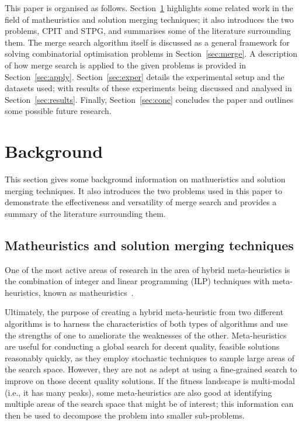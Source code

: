 \documentclass[journal]{IEEEtran}
\begin{document}
This paper is organised as follows. Section~\ref{sec:back} highlights some related work in the field of matheuristics and solution merging techniques; it also introduces the two problems, CPIT and STPG, and summarises some of the literature surrounding them. The merge search algorithm itself is discussed as a general framework for solving combinatorial optimisation problems in Section~\ref{sec:merge}. A description of how merge search is applied to the given problems is provided in Section~\ref{sec:apply}. Section~\ref{sec:exper} details the experimental setup and the datasets used; with results of these experiments being discussed and analysed in Section~\ref{sec:results}. Finally, Section~\ref{sec:conc} concludes the paper and outlines some possible future research.

\section{Background}\label{sec:back}
This section gives some background information on mathueristics and solution merging techniques.
It also introduces the two problems used in this paper to demonstrate the effectiveness and versatility of merge search and provides a summary of the literature surrounding them.

\subsection{Matheuristics and solution merging techniques}
One of the most active areas of research in the area of hybrid meta-heuristics is the combination of integer and linear programming (ILP) techniques with meta-heuristics, known as matheuristics~\cite{matheuristics}.  

Ultimately, the purpose of creating a hybrid meta-heuristic from two different algorithms is to harness the characteristics of both types of algorithms and use the strengths of one to ameliorate the weaknesses of the other. Meta-heuristics are useful for conducting a global search for decent quality, feasible solutions reasonably quickly, as they employ stochastic techniques to sample large areas of the search space. However, they are not as adept at using a fine-grained search to improve on those decent quality solutions. If the fitness landscape is multi-modal (i.e., it has many peaks), some meta-heuristics are also good at identifying multiple areas of the search space that might be of interest; this information can then be used to decompose the problem into smaller sub-problems. 
\end{document}
